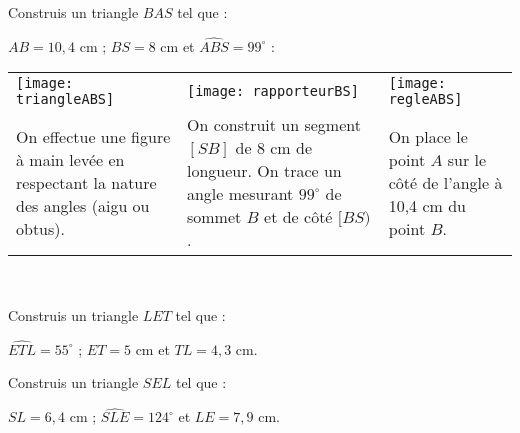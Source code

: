 \begin{methode*1}

 \begin{exemple*1}
Construis un triangle $BAS$ tel que :

$AB = 10,4$ cm ; $BS = 8$ cm et $\widehat{ABS} = 99^\circ$ : \\[1em]
\begin{tabularx}{\textwidth}{X|X|X}
 \texttt{[image: triangleABS]} &  \texttt{[image: rapporteurBS]} & \texttt{[image: regleABS]} \\ 
 On effectue une figure à main levée en respectant la nature des angles (aigu ou obtus). & On construit un segment $[SB]$ de 8 cm de longueur. On trace un angle mesurant $99^\circ$ de sommet $B$ et de côté $[BS)$. & On place le point $A$ sur le côté de l'angle à 10,4 cm du point $B$. \\
\end{tabularx} \\

\end{exemple*1}

\exercice
Construis un triangle $LET$ tel que :

$\widehat{ETL} = 55^\circ$ ; $ET = 5$ cm et $TL = 4,3$ cm.
\vspace{4cm}

\exercice
Construis un triangle $SEL$ tel que :

$SL = 6,4$ cm ; $\widehat{SLE}= 124^\circ$ et $LE = 7,9$ cm.
\vspace{2cm}
 
\end{methode*1}
